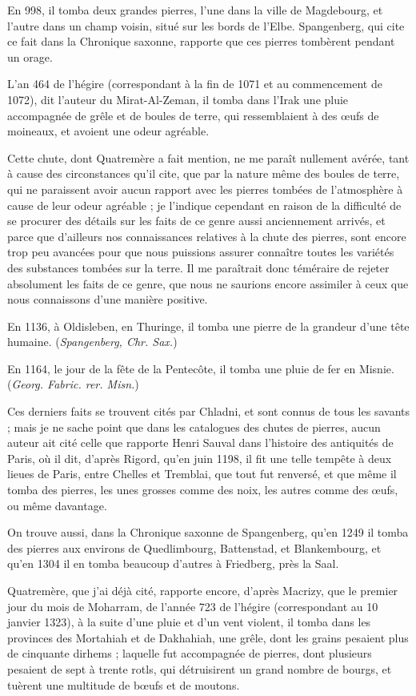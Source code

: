 \documentclass[a4paper, 12pt, oneside, french]{article}
\begin{document}
En 998, il tomba deux grandes pierres, l'une dans la ville de Magdebourg, et l'autre dans un champ voisin, situé sur les bords de l'Elbe. Spangenberg, qui cite ce fait dans la Chronique saxonne, rapporte que ces pierres tombèrent pendant un orage.

L'an 464 de l'hégire (correspondant à la fin de 1071 et au commencement de 1072), dit l'auteur du Mirat-Al-Zeman, il tomba dans l'Irak une pluie accompagnée de grêle et de boules de terre, qui ressemblaient à des œufs de moineaux, et avoient une odeur agréable.

Cette chute, dont Quatremère a fait mention, ne me paraît nullement avérée, tant à cause des circonstances qu'il cite, que par la nature même des boules de terre, qui ne paraissent avoir aucun rapport avec les pierres tombées de l'atmosphère à cause de leur odeur agréable ; je l'indique cependant en raison de la difficulté de se procurer des détails sur les faits de ce genre aussi anciennement arrivés, et parce que d'ailleurs nos connaissances relatives à la chute des pierres, sont encore trop peu avancées pour que nous puissions assurer connaître toutes les variétés des substances tombées sur la terre. Il me paraîtrait donc téméraire de rejeter absolument les faits de ce genre, que nous ne saurions encore assimiler à ceux que nous connaissons d'une manière positive.

En 1136, à Oldisleben, en Thuringe, il tomba une pierre de la grandeur d'une tête humaine. (\emph{Spangenberg, Chr. Sax.})

En 1164, le jour de la fête de la Pentecôte, il tomba une pluie de fer en Misnie. (\emph{Georg. Fabric. rer. Misn.})

Ces derniers faits se trouvent cités par Chladni, et sont connus de tous les savants ; mais je ne sache point que dans les catalogues des chutes de pierres, aucun auteur ait cité celle que rapporte Henri Sauval dans l'histoire des antiquités de Paris, où il dit, d'après Rigord, qu'en juin 1198, il fit une telle tempête à deux lieues de Paris, entre Chelles et Tremblai, que tout fut renversé, et que même il tomba des pierres, les unes grosses comme des noix, les autres comme des œufs, ou même davantage.

On trouve aussi, dans la Chronique saxonne de Spangenberg, qu'en 1249 il tomba des pierres aux environs de Quedlimbourg, Battenstad, et Blankembourg, et qu'en 1304 il en tomba beaucoup d'autres à Friedberg, près la Saal.

Quatremère, que j'ai déjà cité, rapporte encore, d'après Macrizy, que le premier jour du mois de Moharram, de l'année 723 de l'hégire (correspondant au 10 janvier 1323), à la suite d'une pluie et d'un vent violent, il tomba dans les provinces des Mortahiah et de Dakhahiah, une grêle, dont les grains pesaient plus de cinquante dirhems ; laquelle fut accompagnée de pierres, dont plusieurs pesaient de sept à trente rotls, qui détruisirent un grand nombre de bourgs, et tuèrent une multitude de bœufs et de moutons.
\end{document}
